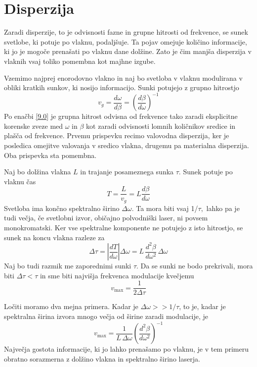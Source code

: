 \section{Disperzija}
\label{chap:Disperzija}
Zaradi disperzije, to je odvisnosti fazne in grupne hitrosti od frekvence,
se sunek svetlobe, ki potuje po vlaknu, podaljšuje. Ta pojav omejuje
količino informacije, ki jo je mogoče prenašati po vlaknu dane dolžine.
Zato je čim manjša disperzija v vlaknih vsaj toliko pomembna kot majhne
izgube.

Vzemimo najprej enorodovno vlakno in naj bo svetloba v vlaknu modulirana
v obliki kratkih sunkov, ki nosijo informacijo. Sunki potujejo z grupno
hitrostjo 
\begin{equation}
v_{g}=\frac{d\omega}{d\beta}=\left(\frac{d\beta}{d\omega}\right)^{-1}\label{9.51}
\end{equation}
 Po enačbi \ref{9.0} je grupna hitrost odvisna od frekvence tako
zaradi eksplicitne korenske zveze med $\omega$ in $\beta$ kot zaradi
odvisnosti lomnih količnikov sredice in plašča od frekvence. Prvemu
prispevku recimo valovodna disperzija, ker je posledica omejitve valovanja
v sredico vlakna, drugemu pa materialna disperzija. Oba prispevka
sta pomembna.

Naj bo dolžina vlakna $L$ in trajanje posameznega sunka $\tau$.
Sunek potuje po vlaknu čas 
\begin{equation}
T=\frac{L}{v_{g}}=L\frac{d\beta}{d\omega}\label{9.52}
\end{equation}
 Svetloba ima končno spektralno širino $\Delta\omega$. Ta mora biti
vsaj 1/$\tau,$ lahko pa je tudi večja, če svetlobni izvor, običajno
polvodniški laser, ni povsem monokromatski. Ker vse spektralne komponente
ne potujejo z isto hitrostjo, se sunek na koncu vlakna razleze za
\begin{equation}
\Delta\tau=\left|\frac{dT}{d\omega}\right|\Delta\omega=L\,\frac{d^{2}\beta}{d\omega^{2}}\,\Delta\omega\label{9.53}
\end{equation}
 Naj bo tudi razmik me zaporednimi sunki $\tau.$ Da se sunki ne bodo
prekrivali, mora biti $\Delta\tau<\tau$ in sme biti najvišja frekvenca
modulacije kvečjemu 
\begin{equation}
v_{\max}=\frac{1}{2\Delta\tau}\label{9.54}
\end{equation}

Ločiti moramo dva mejna primera. Kadar je $\Delta\omega>>1/\tau$,
to je, kadar je spektralna širina izvora mnogo večja od širine zaradi
modulacije, je 
\begin{equation}
v_{\max}=\frac{1}{L\,\Delta\omega}\left(\frac{d^{2}\beta}{d\omega^{2}}\right)^{-1}\label{9.55}
\end{equation}
 Največja gostota informacije, ki jo lahko prenašamo po vlaknu, je
v tem primeru obratno sorazmerna z dolžino vlakna in spektralno širino
laserja.

